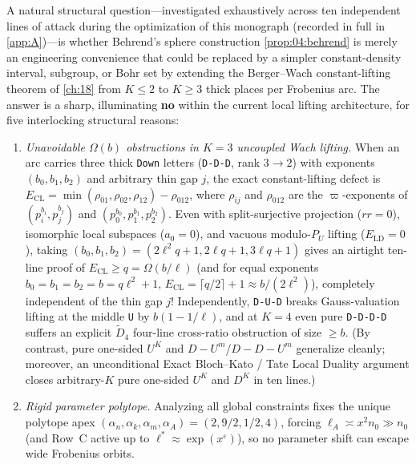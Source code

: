 \begin{remark}
\label{rem:04:behrend-crossroads}
A natural structural question—investigated exhaustively across ten independent lines of attack during the optimization of this monograph (recorded in full in \cref{app:A})—is whether Behrend's sphere construction \cref{prop:04:behrend} is merely an engineering convenience that could be replaced by a simpler constant-density interval, subgroup, or Bohr set by extending the Berger--Wach constant-lifting theorem of \cref{ch:18} from $K \le 2$ to $K \ge 3$ thick places per Frobenius arc. The answer is a sharp, illuminating \textbf{no} within the current local lifting architecture, for five interlocking structural reasons:
\begin{enumerate}[label=\textup{(\arabic*)}]
\item \emph{Unavoidable $\Omega(b)$ obstructions in $K=3$ uncoupled Wach lifting.} When an arc carries three thick \texttt{Down} letters (\texttt{D-D-D}, rank $3 \to 2$) with exponents $(b_0, b_1, b_2)$ and arbitrary thin gap $j$, the exact constant-lifting defect is $E_{\mathrm{CL}} = \min(\rho_{01}, \rho_{02}, \rho_{12}) - \rho_{012}$, where $\rho_{ij}$ and $\rho_{012}$ are the $\varpi$-exponents of $(p_i^{b_i}, p_j^{b_j})$ and $(p_0^{b_0}, p_1^{b_1}, p_2^{b_2})$. Even with split-surjective projection ($rr = 0$), isomorphic local subspaces ($a_0 = 0$), and vacuous modulo-$P_U$ lifting ($E_{\mathrm{LD}} = 0$), taking $(b_0, b_1, b_2) = (2\ell^2 q + 1, 2\ell q + 1, 3\ell q + 1)$ gives an airtight ten-line proof of $E_{\mathrm{CL}} \ge q = \Omega(b/\ell)$ (and for equal exponents $b_0 = b_1 = b_2 = b = q\ell^2 + 1$, $E_{\mathrm{CL}} = \lceil q/2\rceil + 1 \approx b/(2\ell^2)$), completely independent of the thin gap $j$! Independently, \texttt{D-U-D} breaks Gauss-valuation lifting at the middle \texttt{U} by $b(1 - 1/\ell)$, and at $K = 4$ even pure \texttt{D-D-D-D} suffers an explicit $\tilde{D}_4$ four-line cross-ratio obstruction of size $\ge b$. (By contrast, pure one-sided $U^K$ and $D-U^m$/$D-D-U^m$ generalize cleanly; moreover, an unconditional Exact Bloch--Kato / Tate Local Duality argument closes arbitrary-$K$ pure one-sided $U^K$ and $D^K$ in ten lines.)
\item \emph{Rigid parameter polytope.} Analyzing all global constraints fixes the unique polytope apex $(\alpha_n, \alpha_k, \alpha_m, \alpha_A) = (2, 9/2, 1/2, 4)$, forcing $\ell_A \asymp x^2 n_0 \gg n_0$ (and Row~C active up to $\ell^* \approx \exp(x^\varepsilon)$), so no parameter shift can escape wide Frobenius orbits.

\end{enumerate}
\end{remark}
